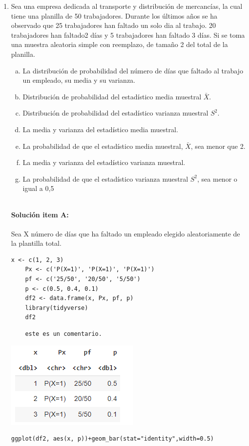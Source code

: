 \begin{enumerate}
\setcounter{enumi}{0}
    \item Sea una empresa dedicada al transporte y distribución de mercancías, la cual tiene una planilla de 50 trabajadores. Durante los últimos años se
ha observado que 25 trabajadores han faltado un solo dia al trabajo. 20 trabajadores han faltado2 días y 5 trabajadores han faltado 3 días. Si se toma una
muestra aleatoria simple con reemplazo, de tamaño 2 del total de la planilla.

    \begin{enumerate}[a)]
        \item La distribución de probabilidad del número de días que faltado al trabajo un empleado, su media y su varianza.
        \item Distribución de probabilidad del estadístico media muestral $\bar{X}$.
        \item Distribución de probabilidad del estadístico varianza muestral $S^2$.
        \item La media y varianza del estadístico media muestral.
        \item La probabilidad de que el estadístico media muestral, $\bar{X}$, sea menor que 2.
        \item La media y varianza del estadístico varianza muestral.
        \item La probabilidad de que el estadístico varianza muestral $S^2$, sea menor o igual a 0,5
    \end{enumerate}

    \\
    \textbf{Solución item A:}
    \\\\
    Sea  X  número de días que ha faltado un empleado elegido aleatoriamente de la plantilla total.
    
    \begin{lstlisting}[frame=single]
    x <- c(1, 2, 3)
    Px <- c('P(X=1)', 'P(X=1)', 'P(X=1)')
    pf <- c('25/50', '20/50', '5/50')
    p <- c(0.5, 0.4, 0.1)
    df2 <- data.frame(x, Px, pf, p)
    library(tidyverse)
    df2
    \end{lstlisting}
    \begin{verbatim}
    este es un comentario.
    \end{verbatim}
    \includegraphics[scale=1]{img/tab1.png}
    \\
    \begin{lstlisting}[frame=single]
    ggplot(df2, aes(x, p))+geom_bar(stat="identity",width=0.5)
    \end{lstlisting}


\end{enumerate}
